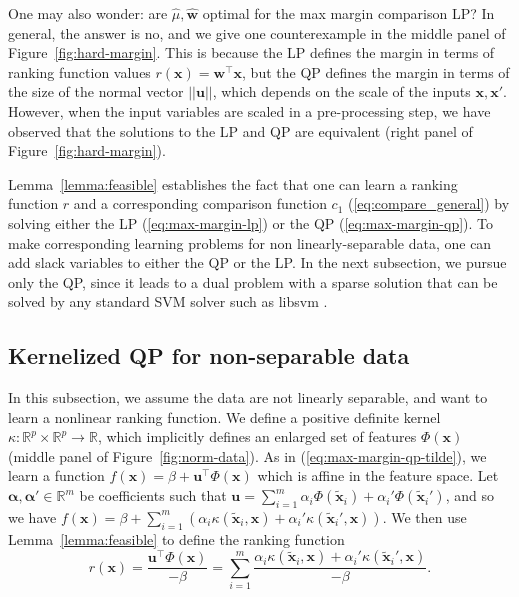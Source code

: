 \documentclass[twoside,11pt]{article}
\newcommand{\RR}{\mathbb R}
\begin{document}
One may also wonder: are $\hat \mu,\mathbf{\hat w}$ optimal for the
max margin comparison LP? In general, the answer is no, and we give
one counterexample in the middle panel of
Figure~\ref{fig:hard-margin}. This is because the LP defines the
margin in terms of ranking function values $r(\mathbf x)=\mathbf
w^\intercal \mathbf x$, but the QP defines the margin in terms of the
size of the normal vector $||\mathbf u||$, which depends on the scale
of the inputs $\mathbf x,\mathbf x'$. However, when the input
variables are scaled in a pre-processing step, we have observed that
the solutions to the LP and QP are equivalent (right panel of
Figure~\ref{fig:hard-margin}).

Lemma~\ref{lemma:feasible} establishes the fact that one can learn a
ranking function $r$ and a corresponding comparison function $c_1$
(\ref{eq:compare_general}) by solving either the LP
(\ref{eq:max-margin-lp}) or the QP (\ref{eq:max-margin-qp}). To make
corresponding learning problems for non linearly-separable data, one can add
slack variables to either the QP or the LP. In the next subsection, we
pursue only the QP, since it leads to a dual problem with a sparse
solution that can be solved by any standard SVM solver such as libsvm
\citep{libsvm}.

\subsection{Kernelized QP for non-separable data}
\label{sec:kernelized-qp}
In this subsection, we assume the data are not linearly separable, and want to
learn a nonlinear ranking function. We define a positive definite
kernel $\kappa:\RR^p\times \RR^p\rightarrow\RR$, which implicitly
defines an enlarged set of features $\Phi(\mathbf x)$ (middle panel of
Figure~\ref{fig:norm-data}). As in (\ref{eq:max-margin-qp-tilde}), we
learn a function $f(\mathbf x)=\beta + \mathbf u^\intercal
\Phi(\mathbf x)$ which is affine in the feature space. Let $\mathbf
\alpha,\mathbf \alpha'\in\RR^m$ be coefficients such that $\mathbf
u=\sum_{i=1}^m
\alpha_i \Phi(\mathbf{\tilde x}_i) + 
\alpha_i' \Phi(\mathbf{\tilde x}_i')$, and so we have
 $f(\mathbf x) =\beta + \sum_{i=1}^m 
 (\alpha_i \kappa(\mathbf{\tilde x}_i, \mathbf x) +
 \alpha_i' \kappa(\mathbf{\tilde x}_i', \mathbf x))$. 
 We then use Lemma~\ref{lemma:feasible} to
define the ranking function
\begin{equation}
  \label{eq:kernelized_r}
  r(\mathbf x)= \frac{\mathbf u^\intercal \Phi(\mathbf x)}{-\beta} = 
  \sum_{i=1}^m
  \frac{
    \alpha_i \kappa(\mathbf{\tilde x}_i, \mathbf x) +
    \alpha_i'  \kappa(\mathbf{\tilde x}_i', \mathbf x)}
{-\beta}.
\end{equation}
\end{document}
